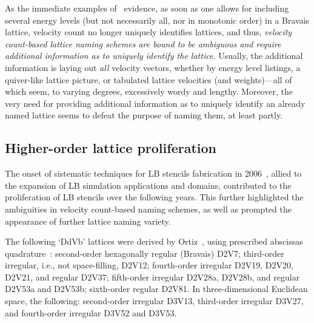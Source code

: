 
    As the immediate examples of~\cite{2006-PhilippiPC+SurmasR-PhysRevE} evidence, as soon as one allows for  including  several
    energy levels (but not necessarily all, nor in monotonic order) in a Bravais lattice,  velocity  count  no  longer  uniquely
    identifies lattices, and thus, \emph{velocity count-based lattice naming schemes are  bound  to  be  ambiguous  and  require
    additional information as to uniquely identify the lattice.\/} Usually, the additional information is laying out  \emph{all}
    velocity vectors, whether by energy level listings, a quiver-like lattice picture,  or  tabulated  lattice  velocities  (and
    weights)---all of which seem, to varying degrees, excessively wordy and lengthy.  Moreover,  the  very  need  for  providing
    additional information as to uniquely identify an already named lattice seems to defeat the purpose of naming them, at least
    partly.

    \subsection{Higher-order lattice proliferation}

    The onset of sistematic techniques  for  LB  stencils  fabrication  in  2006~\cite{2006-ChikatamarlaSS+KarlinIV-PhysRevLett,
    2006-PhilippiPC+SurmasR-PhysRevE, 2006-ShanX+ChenH-JFluidMech}, allied to the expansion of LB  simulation  applications  and
    domains, contributed to the proliferation of LB stencils over the following years. This further highlighted the  ambiguities
    in velocity count-based naming schemes, as well as prompted the appearance of further lattice naming variety.

    The  following  `DdVb'  lattices   were   derived   by   Ortiz~\cite{2007-OrtizCEP-DrUFSC},   using   prescribed   abscissas
    quadrature~\cite{2006-PhilippiPC+SurmasR-PhysRevE}: second-order hexagonally regular (Bravais) D2V7; third-order  irregular,
    i.e., not space-filling, D2V12; fourth-order irregular D2V19, D2V20, D2V21, and regular D2V37; fifth-order irregular D2V28a,
    D2V28b, and regular D2V53a and D2V53b; sixth-order regular D2V81.  In  three-dimensional  Euclidean  space,  the  following:
    second-order irregular D3V13, third-order irregular D3V27, and fourth-order irregular D3V52 and D3V53.

